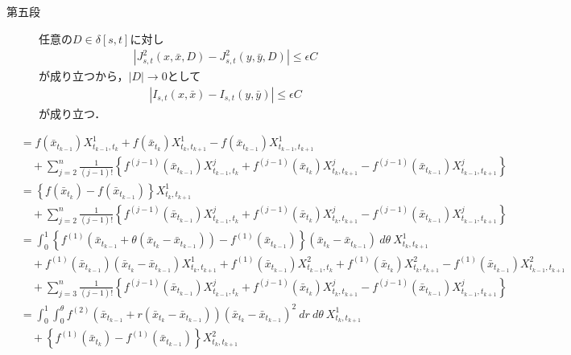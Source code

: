 \begin{prf}
\begin{description}
			\item[第五段]
				任意の$D \in \delta[s,t]$に対し
				\begin{align}
					\left| J^2_{s,t}(x,\bar{x},D) - J^2_{s,t}(y,\bar{y},D) \right| \leq \epsilon C
				\end{align}
				が成り立つから，$|D| \longrightarrow 0$として
				\begin{align}
					\left| I_{s,t}(x,\bar{x}) - I_{s,t}(y,\bar{y}) \right| \leq \epsilon C
				\end{align}
				が成り立つ．
				\QED
		\end{description}
	\end{prf}
	
	\begin{prf}
		\begin{align}
			&= f(\bar{x}_{t_{k-1}})X^1_{t_{k-1},t_k} + f(\bar{x}_{t_k})X^1_{t_k,t_{k+1}} - f(\bar{x}_{t_{k-1}})X^1_{t_{k-1},t_{k+1}} \\
				&\quad + \sum_{j=2}^n \frac{1}{(j-1)!} \left\{ f^{(j-1)}(\bar{x}_{t_{k-1}})X^j_{t_{k-1},t_k} + f^{(j-1)}(\bar{x}_{t_k})X^j_{t_k,t_{k+1}} - f^{(j-1)}(\bar{x}_{t_{k-1}})X^j_{t_{k-1},t_{k+1}} \right\} \\
			&= \left\{ f(\bar{x}_{t_k}) - f(\bar{x}_{t_{k-1}}) \right\} X^1_{t_k,t_{k+1}} \\
				&\quad + \sum_{j=2}^n \frac{1}{(j-1)!} \left\{ f^{(j-1)}(\bar{x}_{t_{k-1}})X^j_{t_{k-1},t_k} + f^{(j-1)}(\bar{x}_{t_k})X^j_{t_k,t_{k+1}} - f^{(j-1)}(\bar{x}_{t_{k-1}})X^j_{t_{k-1},t_{k+1}} \right\} \\
			&= \int_0^1 \left\{ f^{(1)}(\bar{x}_{t_{k-1}} + \theta(\bar{x}_{t_k} - \bar{x}_{t_{k-1}})) - f^{(1)}(\bar{x}_{t_{k-1}})\right\}(\bar{x}_{t_k} - \bar{x}_{t_{k-1}})\ d\theta\ X^1_{t_k,t_{k+1}} \\
				&\quad + f^{(1)}(\bar{x}_{t_{k-1}})(\bar{x}_{t_k} - \bar{x}_{t_{k-1}})X^1_{t_k,t_{k+1}}
					+ f^{(1)}(\bar{x}_{t_{k-1}})X^2_{t_{k-1},t_k} + f^{(1)}(\bar{x}_{t_k})X^2_{t_k,t_{k+1}} - f^{(1)}(\bar{x}_{t_{k-1}})X^2_{t_{k-1},t_{k+1}} \\
				&\quad + \sum_{j=3}^n \frac{1}{(j-1)!} \left\{ f^{(j-1)}(\bar{x}_{t_{k-1}})X^j_{t_{k-1},t_k} + f^{(j-1)}(\bar{x}_{t_k})X^j_{t_k,t_{k+1}} - f^{(j-1)}(\bar{x}_{t_{k-1}})X^j_{t_{k-1},t_{k+1}} \right\} \\
			&= \int_0^1 \int_0^{\theta} f^{(2)}(\bar{x}_{t_{k-1}} + r(\bar{x}_{t_k} - \bar{x}_{t_{k-1}}))(\bar{x}_{t_k} - \bar{x}_{t_{k-1}})^2\ dr\ d\theta\ X^1_{t_k,t_{k+1}} \\
				&\quad + \left\{ f^{(1)}(\bar{x}_{t_k}) - f^{(1)}(\bar{x}_{t_{k-1}}) \right\} X^2_{t_k,t_{k+1}} \\

\end{align}
\end{prf}
